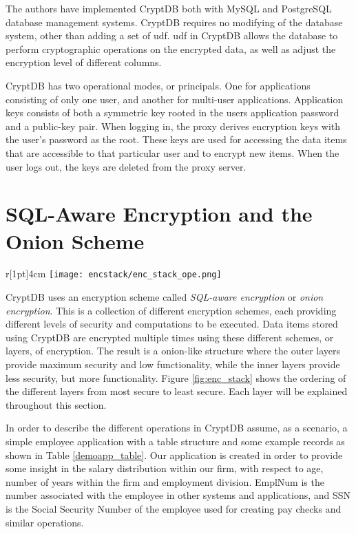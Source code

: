 The authors \citep{CryptDB_Main_Paper} have implemented CryptDB both with MySQL and PostgreSQL database management systems. CryptDB requires no modifying of the database system, other than adding a set of \Gls{udf}. \Gls{udf} in CryptDB allows the database to perform cryptographic operations on the encrypted data, as well as adjust the encryption level of different columns.

CryptDB has two operational modes, or principals. One for applications consisting of only one user, and another for multi-user applications. Application keys consists of both a symmetric key rooted in the users application password and a public-key pair. When logging in, the proxy derives encryption keys with the user's password as the root. These keys are used for accessing the data items that are accessible to that particular user and to encrypt new items. When the user logs out, the keys are deleted from the proxy server.



\section{SQL-Aware Encryption and the Onion Scheme}
\label{sec:sqlaware}

\begin{wrapfigure}[17]{r}[1pt]{4cm}
\centering
\texttt{[image: encstack/enc\_stack\_ope.png]}
\caption{Ordering of the different encryption layers based on the security they provide}
\label{fig:enc_stack}
\end{wrapfigure}

CryptDB uses an encryption scheme called \emph{SQL-aware encryption} or \textit{onion encryption}. This is a collection of different encryption schemes, each providing different levels of security and computations to be executed. Data items stored using CryptDB are encrypted multiple times using these different schemes, or layers, of encryption. The result is a onion-like structure where the outer layers provide maximum security and low functionality, while the inner layers provide less security, but more functionality. Figure \ref{fig:enc_stack} shows the ordering of the different layers from most secure to least secure. Each layer will be explained throughout this section.

In order to describe the different operations in CryptDB  assume, as a scenario, a simple employee application with a table structure and some example records as shown in Table \ref{demoapp_table}. Our application is created in order to provide some insight in the salary distribution within our firm, with respect to age, number of years within the firm and employment division. EmplNum is the number associated with the employee in other systems and applications, and SSN is the Social Security Number of the employee used for creating pay checks and similar operations.

